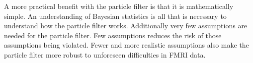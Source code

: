A more practical benefit with the particle filter is that it is mathematically
simple. An understanding of Bayesian statistics is all that is necessary to understand
how the particle filter works.  Additionally very few assumptions
are needed for the particle filter. Few assumptions  reduces the risk of those assumptions
being violated. Fewer and more realistic assumptions also make the particle 
filter more robust to unforeseen difficulties in FMRI data. 




